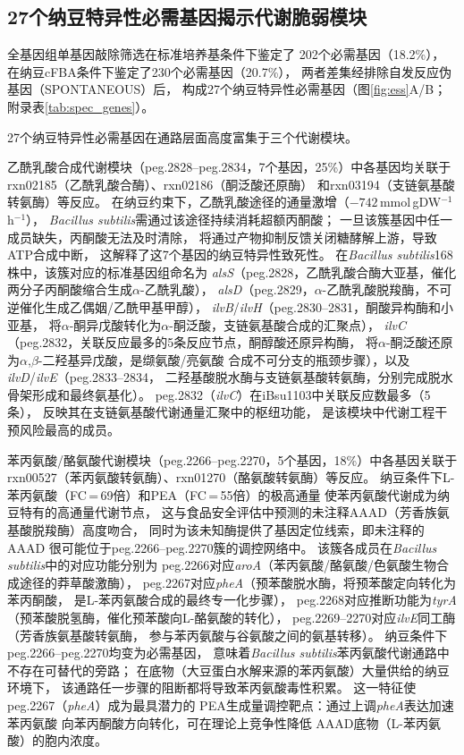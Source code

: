 \documentclass[10pt, a4paper, twocolumn]{ctexart}
\newcommand{\ibsu}{iBsu1103}
\newcommand{\bs}{\textit{Bacillus subtilis}}
\newcommand{\cfba}{cFBA}
\newcommand{\mmolg}{mmol\,gDW$^{-1}$h$^{-1}$}
\begin{document}
\subsection{27个纳豆特异性必需基因揭示代谢脆弱模块}

全基因组单基因敲除筛选在标准培养基条件下鉴定了
202个必需基因（18.2\%），
在纳豆\cfba{}条件下鉴定了230个必需基因（20.7\%），
两者差集经排除自发反应伪基因（SPONTANEOUS）后，
构成27个纳豆特异性必需基因（图\ref{fig:ess}A/B；
附录表\ref{tab:spec_genes}）。

27个纳豆特异性必需基因在通路层面高度富集于三个代谢模块。

乙酰乳酸合成代谢模块（peg.2828--peg.2834，7个基因，25\%）中各基因均关联于
rxn02185（乙酰乳酸合酶）、rxn02186（酮泛酸还原酶）
和rxn03194（支链氨基酸转氨酶）等反应。
在纳豆约束下，乙酰乳酸途径的通量激增（$-742$\,\mmolg{}），
\bs{}需通过该途径持续消耗超额丙酮酸；
一旦该簇基因中任一成员缺失，丙酮酸无法及时清除，
将通过产物抑制反馈关闭糖酵解上游，导致ATP合成中断，
这解释了这7个基因的纳豆特异性致死性。
在\bs{}168株中，该簇对应的标准基因组命名为
\textit{alsS}（peg.2828，乙酰乳酸合酶大亚基，催化两分子丙酮酸缩合生成$\alpha$-乙酰乳酸），
\textit{alsD}（peg.2829，$\alpha$-乙酰乳酸脱羧酶，不可逆催化生成乙偶姻/乙酰甲基甲醇），
\textit{ilvB}/\textit{ilvH}（peg.2830--2831，酮酸异构酶和小亚基，
将$\alpha$-酮异戊酸转化为$\alpha$-酮泛酸，支链氨基酸合成的汇聚点），
\textit{ilvC}（peg.2832，关联反应最多的5条反应节点，酮醇酸还原异构酶，
将$\alpha$-酮泛酸还原为$\alpha$,$\beta$-二羟基异戊酸，是缬氨酸/亮氨酸
合成不可分支的瓶颈步骤），以及\textit{ilvD}/\textit{ilvE}（peg.2833--2834，
二羟基酸脱水酶与支链氨基酸转氨酶，分别完成脱水骨架形成和最终氨基化）。
peg.2832（\textit{ilvC}）在\ibsu{}中关联反应数最多（5条），
反映其在支链氨基酸代谢通量汇聚中的枢纽功能，
是该模块中代谢工程干预风险最高的成员。

苯丙氨酸/酪氨酸代谢模块（peg.2266--peg.2270，5个基因，18\%）中各基因关联于
rxn00527（苯丙氨酸转氨酶）、rxn01270（酪氨酸转氨酶）等反应。
纳豆条件下L-苯丙氨酸（FC\,=\,69倍）和PEA（FC\,=\,55倍）的极高通量
使苯丙氨酸代谢成为纳豆特有的高通量代谢节点，
这与食品安全评估中预测的未注释AAAD（芳香族氨基酸脱羧酶）高度吻合，
同时为该未知酶提供了基因定位线索，即未注释的AAAD
很可能位于peg.2266--peg.2270簇的调控网络中。
该簇各成员在\bs{}中的对应功能分别为
peg.2266对应\textit{aroA}（苯丙氨酸/酪氨酸/色氨酸生物合成途径的莽草酸激酶），
peg.2267对应\textit{pheA}（预苯酸脱水酶，将预苯酸定向转化为苯丙酮酸，
是L-苯丙氨酸合成的最终专一化步骤），
peg.2268对应推断功能为\textit{tyrA}（预苯酸脱氢酶，催化预苯酸向L-酪氨酸的转化），
peg.2269--2270对应\textit{ilvE}同工酶（芳香族氨基酸转氨酶，
参与苯丙氨酸与谷氨酸之间的氨基转移）。
纳豆条件下peg.2266--peg.2270均变为必需基因，
意味着\bs{}苯丙氨酸代谢通路中不存在可替代的旁路；
在底物（大豆蛋白水解来源的苯丙氨酸）大量供给的纳豆环境下，
该通路任一步骤的阻断都将导致苯丙氨酸毒性积累。
这一特征使peg.2267（\textit{pheA}）成为最具潜力的
PEA生成量调控靶点：通过上调\textit{pheA}表达加速苯丙氨酸
向苯丙酮酸方向转化，可在理论上竞争性降低
AAAD底物（L-苯丙氨酸）的胞内浓度。
\end{document}
